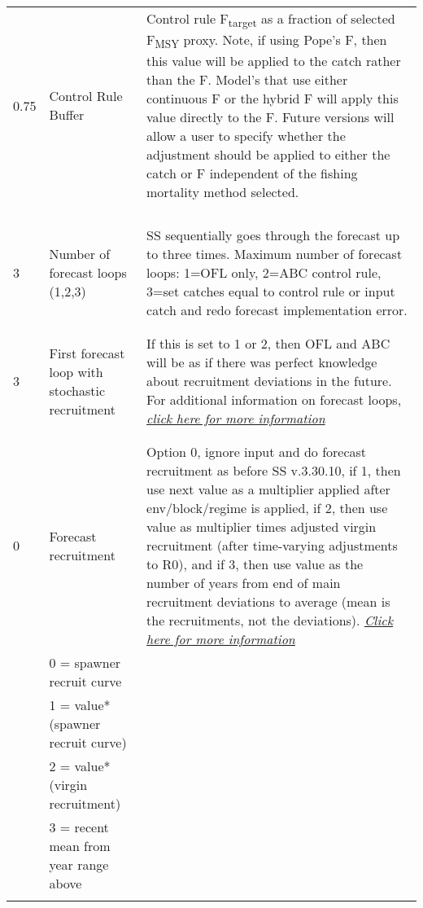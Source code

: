 \begin{landscape}
{\begin{longtable}{p{3.2cm} p{7cm} p{10.8cm}}
 \hline
 0.75 \Tstrut & Control Rule Buffer & \multirow{1}{1cm}[-0.25cm]{\parbox{11cm}{Control rule F\textsubscript{target} as a fraction of selected F\textsubscript{MSY} proxy. Note, if using Pope's F, then this value will be applied to the catch rather than the F.  Model's that use either continuous F or the hybrid F will apply this value directly to the F.  Future versions will allow a user to specify whether the adjustment should be applied to either the catch or F independent of the fishing mortality method selected.}} \\ 
  & & \\
  & & \\
  & & \\
  & & \Bstrut\\
 
 \pagebreak %
 
 3 \Tstrut & Number of forecast loops (1,2,3) & \multirow{1}{1cm}[-0.25cm]{\parbox{11cm}{SS sequentially goes through the forecast up to three times.  Maximum number of forecast loops: 1=OFL only, 2=ABC control rule, 3=set catches equal to control rule or input catch and redo forecast implementation error.}} \\
 & & \\
 & & \Bstrut\Bstrut\\
 
 \hline  
 3 \Tstrut & First forecast loop with stochastic recruitment & \multirow{1}{1cm}[-0.25cm]{\parbox{11cm}{If this is set to 1 or 2, then OFL and ABC will be as if there was perfect knowledge about recruitment deviations in the future. For additional information on forecast loops, \hyperlink{appendB}{\textit{click here for more information}} }} \\
   & & \\
   & & \\
 
 \hline
 0 \Tstrut & Forecast recruitment & \multirow{1}{1cm}[-0.25cm]{\parbox{11cm}{Option 0, ignore input and do forecast recruitment as before SS v.3.30.10, if 1, then use next value as a multiplier applied after env/block/regime is applied, if 2, then use value as multiplier times adjusted virgin recruitment (after time-varying adjustments to R0), and if 3, then use value as the number of years from end of main recruitment deviations to average (mean is the recruitments, not the deviations).  \hyperlink{ForeSpawn}{\textit{Click here for more information}}}} \\
    & 0 = spawner recruit curve & \\
    & 1 = value*(spawner recruit curve) & \\
    & 2 = value*(virgin recruitment) & \\
    & 3 = recent mean from year range above & \\
    & & \\
     

\end{longtable}}
\end{landscape}
